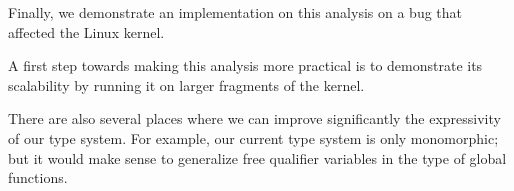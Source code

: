 Finally, we demonstrate an implementation on this analysis on a bug that
affected the Linux kernel.

A first step towards making this analysis more practical is to demonstrate its
scalability by running it on larger fragments of the kernel.

There are also several places where we can improve significantly the
expressivity of our type system. For example, our current type system is only
monomorphic; but it would make sense to generalize free qualifier variables in
the type of global functions.

